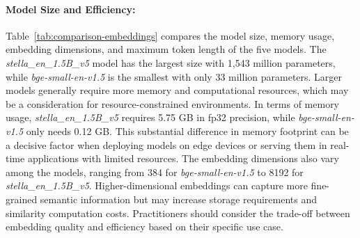 \paragraph{Model Size and Efficiency:}
Table~\ref{tab:comparison-embeddings} compares the model size, memory usage, embedding dimensions, and maximum token length of the five models. 
The \textit{stella\_en\_1.5B\_v5} model has the largest size with 1,543 million parameters, while \textit{bge-small-en-v1.5} is the smallest with only 33 million parameters.
Larger models generally require more memory and computational resources, which may be a consideration for resource-constrained environments.
In terms of memory usage, \textit{stella\_en\_1.5B\_v5} requires 5.75 GB in fp32 precision, while \textit{bge-small-en-v1.5} only needs 0.12 GB.
This substantial difference in memory footprint can be a decisive factor when deploying models on edge devices or serving them in real-time applications with limited resources.
The embedding dimensions also vary among the models, ranging from 384 for \textit{bge-small-en-v1.5} to 8192 for \textit{stella\_en\_1.5B\_v5}.
Higher-dimensional embeddings can capture more fine-grained semantic information but may increase storage requirements and similarity computation costs.
Practitioners should consider the trade-off between embedding quality and efficiency based on their specific use case.

\begin{table}[ht!]
    \centering
    \noindent
    \caption{Comparison of characteristics of embedding models}
    \label{tab:comparison-embeddings}
\end{table}

